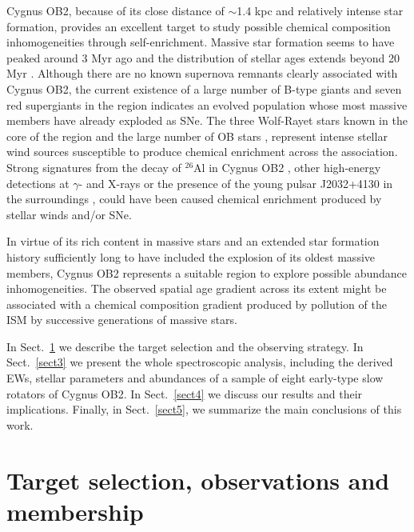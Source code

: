 \documentclass{aa} %
\begin{document}
Cygnus OB2, because of its close distance of $\sim$1.4 kpc \citep{rygl12} and relatively intense star formation, provides an excellent target to study possible chemical composition inhomogeneities through self-enrichment. Massive star formation seems to have peaked around 3 Myr ago \citep{com12,wright15, berlanas17} and the distribution of stellar ages extends beyond 20 Myr \citep{com16}. Although there are no known supernova remnants clearly associated with Cygnus OB2, the current existence of a large number of B-type giants  \citep{berlanas17} and seven red supergiants in the region \citep{com16} indicates an evolved population whose most massive members have already exploded as SNe. The three Wolf-Rayet stars known in the core of the region  and the large number of OB stars \citep{wright15}, represent intense stellar wind sources susceptible to produce chemical enrichment across the association.
Strong signatures from the decay of  $^{26}$Al in Cygnus OB2 \citep{knoedl02}, other high-energy detections at $\gamma$- and X-rays \citep{martin9, martin10, bednarek03, butt06} or the presence of the young pulsar J2032+4130 in the surroundings \citep{abdo09, camilo09}, could have been caused chemical enrichment produced by stellar winds and/or SNe. 
 

In virtue of its rich content in massive stars and an extended star formation history sufficiently long to have included the explosion of its oldest massive members, Cygnus OB2 represents a suitable region to explore possible abundance inhomogeneities. The observed spatial age gradient across its extent \citep{com12} might be associated with a chemical composition gradient produced by pollution of the ISM by successive generations of massive stars.


In Sect.~\ref{sect2} we describe the target selection and the observing strategy. In Sect.~\ref{sect3} we present the whole spectroscopic analysis, including the derived EWs, stellar parameters and abundances of a sample of eight early-type slow rotators of Cygnus OB2. In Sect.~\ref{sect4} we  discuss our results and their implications. Finally, in Sect.~\ref{sect5}, we summarize the main conclusions of this work.


\section{Target selection, observations and membership}\label{sect2}
\end{document}
